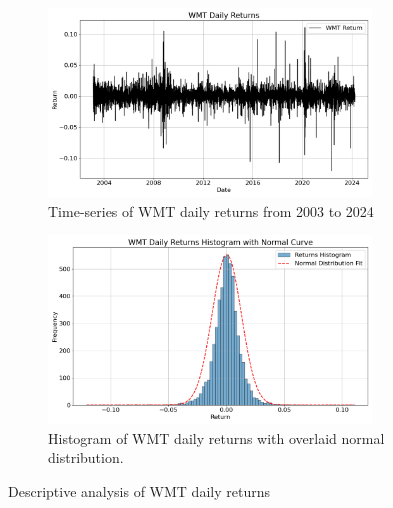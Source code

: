 \begin{figure}[H]
    \centering
    \begin{subfigure}[b]{0.49\textwidth}
        \centering
        \includegraphics[width=\linewidth, height=5cm]{Images/Data/descriptive_statistics_WMT_daily_return_plot.png}
        \caption{Time-series of WMT daily returns from 2003 to 2024}
        \label{fig:descriptive_statistics_WMT_daily_return_plot}
    \end{subfigure}
    \hfill
    \begin{subfigure}[b]{0.49\textwidth}
        \centering
        \includegraphics[width=\linewidth, height=5cm]{Images/Data/descriptive_statistics_WMT_daily_return_histogram.png}
        \caption{Histogram of WMT daily returns with overlaid normal distribution.}
        \label{fig:descriptive_statistics_WMT_daily_return_histogram}
    \end{subfigure}
    \caption{Descriptive analysis of WMT daily returns}
    \label{fig:descriptive_analysis_of_WMT_daily_returns}
\end{figure}

